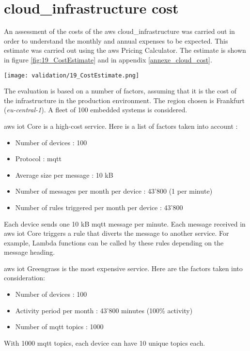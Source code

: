 \section{\texorpdfstring{\Gls{cloud_infrastructure}}{} cost}

An assessment of the costs of the \gls{aws} \gls{cloud_infrastructure} was carried out in order to understand the monthly and annual expenses to be expected. This estimate was carried out using the \gls{aws} Pricing Calculator. The estimate is shown in figure \ref{fig:19_CostEstimate} and in appendix \ref{annexe_cloud_cost}.
\begin{center}
    \begingroup
    \texttt{[image: validation/19\_CostEstimate.png]}
    \label{fig:19_CostEstimate}
    \endgroup
\end{center}
The evaluation is based on a number of factors, assuming that it is the cost of the infrastructure in the production environment. The region chosen is Frankfurt (\textit{eu-central-1}). A fleet of 100 embedded systems is considered.

\gls{aws} \acrshort{iot} Core is a high-cost service. Here is a list of factors taken into account :
\begin{itemize}
    \item Number of devices : 100
    \item Protocol : \acrshort{mqtt}
    \item Average size per message : 10 kB
    \item Number of messages per month per device : 43'800 (1 per minute)
    \item Number of rules triggered per month per device : 43'800
\end{itemize}
Each device sends one 10 kB \acrshort{mqtt} message per minute. Each message received in \gls{aws} \acrshort{iot} Core triggers a rule that diverts the message to another service. For example, Lambda functions can be called by these rules depending on the message heading.

\gls{aws} \acrshort{iot} Greengrass is the most expensive service. Here are the factors taken into consideration:
\begin{itemize}
    \item Number of devices : 100
    \item Activity period per month : 43'800 minutes (100\% activity)
    \item Number of \acrshort{mqtt} topics : 1000
\end{itemize}
With 1000 \acrshort{mqtt} topics, each device can have 10 unique topics each.

